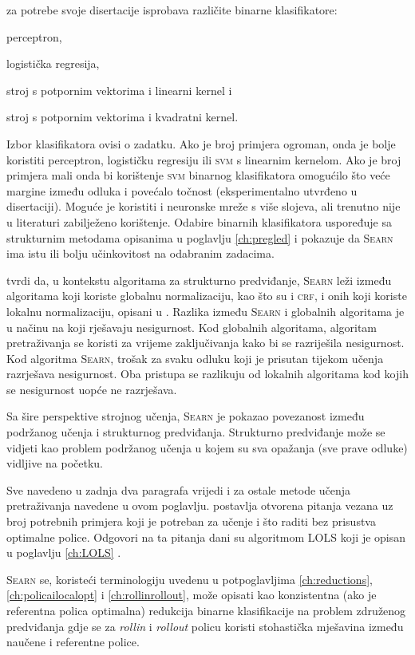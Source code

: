 \citeauthor{daume06thesis} za potrebe svoje disertacije isprobava različite
binarne klasifikatore:
\begin{inlinelist}
  \item perceptron,
  \item logistička regresija,
  \item stroj s potpornim vektorima i linearni kernel i
  \item stroj s potpornim vektorima i kvadratni kernel.
\end{inlinelist}
Izbor klasifikatora ovisi o zadatku. Ako je broj primjera ogroman, onda je bolje
koristiti perceptron, logističku regresiju ili \textsc{svm} s linearnim
kernelom. Ako je broj primjera mali onda bi korištenje \textsc{svm} binarnog
klasifikatora omogućilo što veće margine između odluka i povećalo točnost
(eksperimentalno utvrđeno u disertaciji). Moguće je koristiti i neuronske mreže
s više slojeva, ali trenutno nije u literaturi zabilježeno korištenje. Odabire
binarnih klasifikatora \citeauthor{daume06thesis} uspoređuje sa strukturnim
metodama opisanima u poglavlju \ref{ch:pregled} i pokazuje da \textsc{Searn} ima
istu ili bolju učinkovitost na odabranim zadacima.

\citeauthor{daume06thesis} tvrdi da, u kontekstu algoritama za strukturno
predviđanje, \textsc{Searn} leži između algoritama koji koriste globalnu
normalizaciju, kao što su \mmmm{} i \textsc{crf}, i onih koji koriste lokalnu
normalizaciju, opisani u \citep{punyakanok2001use}. Razlika između
\textsc{Searn} i globalnih algoritama je u načinu na koji rješavaju nesigurnost.
Kod globalnih algoritama, algoritam pretraživanja se koristi za vrijeme
zaključivanja kako bi se razriješila nesigurnost. Kod algoritma \textsc{Searn},
trošak za svaku odluku koji je prisutan tijekom učenja razrješava nesigurnost.
Oba pristupa se razlikuju od lokalnih algoritama kod kojih se nesigurnost uopće
ne razrješava.

Sa šire perspektive strojnog učenja, \textsc{Searn} je pokazao povezanost između
podržanog učenja i strukturnog predviđanja. Strukturno predviđanje može se
vidjeti kao problem podržanog učenja u kojem su sva opažanja (sve prave odluke)
vidljive na početku.

Sve navedeno u zadnja dva paragrafa vrijedi i za ostale metode učenja
pretraživanja navedene u ovom poglavlju. \citeauthor{daume06thesis} postavlja
otvorena pitanja vezana uz broj potrebnih primjera koji je potreban za učenje i
što raditi bez prisustva optimalne police. Odgovori na ta pitanja dani su
algoritmom \textsc{LOLS} koji je opisan u poglavlju \ref{ch:LOLS}
\citep{daume15lols}.

\textsc{Searn} se, koristeći terminologiju uvedenu u potpoglavljima
\ref{ch:reductions}, \ref{ch:policailocalopt} i \ref{ch:rollinrollout}, može
opisati kao konzistentna (ako je referentna polica optimalna) redukcija binarne
klasifikacije na problem združenog predviđanja gdje se za \textit{rollin} i
\textit{rollout} policu koristi stohastička mješavina između naučene i
referentne police.
